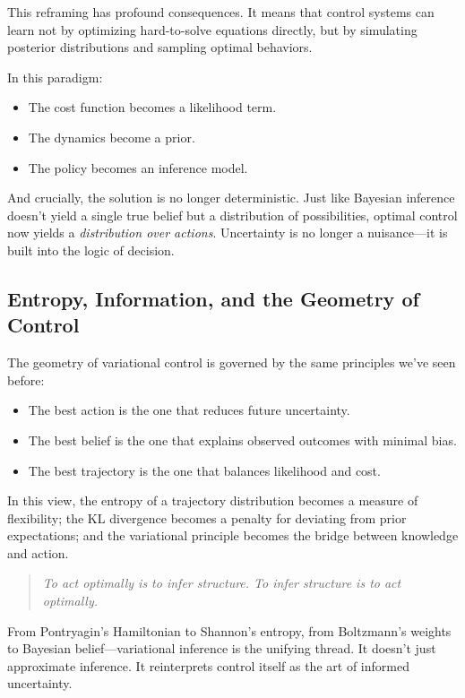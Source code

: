 This reframing has profound consequences. It means that control systems can learn not by optimizing hard-to-solve equations directly, but by simulating posterior distributions and sampling optimal behaviors.

In this paradigm:
\begin{itemize}
  \item The cost function becomes a likelihood term.
  \item The dynamics become a prior.
  \item The policy becomes an inference model.
\end{itemize}

And crucially, the solution is no longer deterministic. Just like Bayesian inference doesn’t yield a single true belief but a distribution of possibilities, optimal control now yields a \emph{distribution over actions}. Uncertainty is no longer a nuisance—it is built into the logic of decision.

\subsection{Entropy, Information, and the Geometry of Control}

The geometry of variational control is governed by the same principles we’ve seen before:

\begin{itemize}
  \item The best action is the one that reduces future uncertainty.
  \item The best belief is the one that explains observed outcomes with minimal bias.
  \item The best trajectory is the one that balances likelihood and cost.
\end{itemize}

In this view, the entropy of a trajectory distribution becomes a measure of flexibility; the KL divergence becomes a penalty for deviating from prior expectations; and the variational principle becomes the bridge between knowledge and action.

\begin{quote}
\textit{To act optimally is to infer structure. To infer structure is to act optimally.}
\end{quote}

From Pontryagin’s Hamiltonian to Shannon’s entropy, from Boltzmann’s weights to Bayesian belief—variational inference is the unifying thread. It doesn’t just approximate inference. It reinterprets control itself as the art of informed uncertainty.


